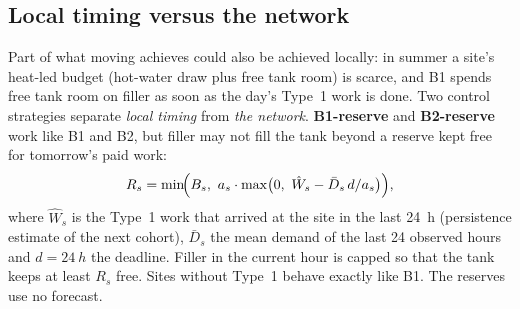 \subsection{Local timing versus the network}

Part of what moving achieves could also be achieved locally: in summer a site's heat-led budget
(hot-water draw plus free tank room) is scarce, and B1 spends free tank room on filler as soon as
the day's Type~1 work is done. Two control strategies separate \emph{local timing}
from \emph{the network}. \textbf{B1-reserve} and \textbf{B2-reserve} work like B1 and B2, but filler
may not fill the tank beyond a reserve kept free for tomorrow's paid work:
\begin{equation}
  R_s = \min\!\Bigl(B_s,\ a_s \cdot \max\bigl(0,\ \hat W_s - \bar D_s\, d / a_s\bigr)\Bigr),
  \label{eq:reserve}
\end{equation}
where $\hat W_s$ is the Type~1 work that arrived at the site in the last \qty{24}{h} (persistence
estimate of the next cohort), $\bar D_s$ the mean demand of the last 24 observed hours and
$d = \qty{24}{h}$ the deadline. Filler in the current hour is capped so that the tank keeps at least
$R_s$ free. Sites without Type~1 behave exactly like B1. The reserves use no forecast.
